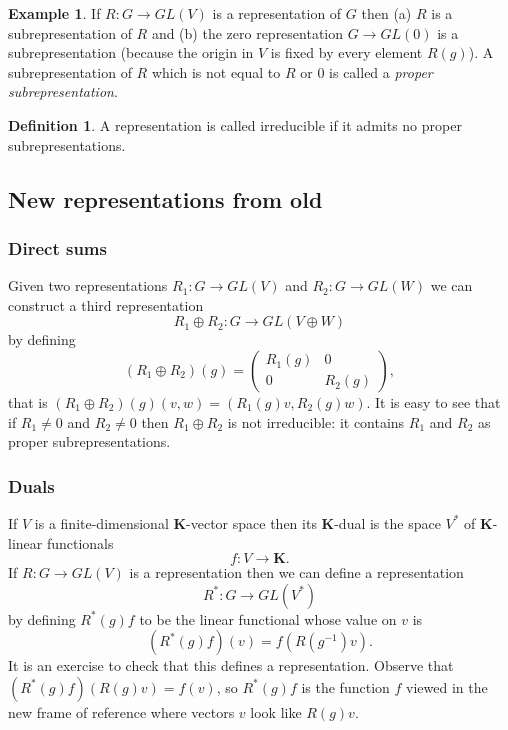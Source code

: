 \documentclass[12pt]{article}
\newcommand{\KK}{\mathbf{K}}
\theoremstyle{definition}
\newtheorem{dfn}[thm]{Definition}
\newtheorem{exm}[thm]{Example}
\theoremstyle{check}
\theoremstyle{remark}
\theoremstyle{TheoremNum}
\begin{document}
\begin{exm}
If $R\colon G\to GL(V)$ is a representation of $G$ then (a) $R$ is a subrepresentation of $R$ and (b) the zero representation $G\to GL(0)$ is a subrepresentation (because the origin in $V$ is fixed by every element $R(g)$). A subrepresentation of $R$ which is not equal to $R$ or $0$ is called a {\em proper subrepresentation}.
\end{exm}

\begin{dfn}
A representation is called irreducible if it admits no proper subrepresentations.
\end{dfn}

\subsection{New representations from old}

\subsubsection{Direct sums}

Given two representations $R_1\colon G\to GL(V)$ and $R_2\colon G\to GL(W)$ we can construct a third representation
\[R_1\oplus R_2\colon G\to GL(V\oplus W)\]
by defining
\[(R_1\oplus R_2)(g)=\left(\begin{array}{cc}
R_1(g) & 0\\
0 & R_2(g)
\end{array}\right),\]
that is $(R_1\oplus R_2)(g)(v,w)=(R_1(g)v,R_2(g)w)$. It is easy to see that if $R_1\neq 0$ and $R_2\neq 0$ then $R_1\oplus R_2$ is not irreducible: it contains $R_1$ and $R_2$ as proper subrepresentations. 

\subsubsection{Duals}

If $V$ is a finite-dimensional $\KK$-vector space then its $\KK$-dual is the space $V^*$ of $\KK$-linear functionals
\[f\colon V\to\KK.\]
If $R\colon G\to GL(V)$ is a representation then we can define a representation
\[R^*\colon G\to GL(V^*)\]
by defining $R^*(g)f$ to be the linear functional whose value on $v$ is
\[(R^*(g)f)(v)=f(R(g^{-1})v).\]
It is an exercise to check that this defines a representation. Observe that $(R^*(g)f)(R(g)v)=f(v)$, so $R^*(g)f$ is the function $f$ viewed in the new frame of reference where vectors $v$ look like $R(g)v$.
\end{document}
